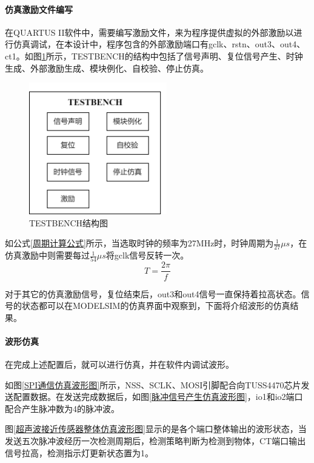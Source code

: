 \paragraph{仿真激励文件编写}
在QUARTUS II软件中，需要编写激励文件，来为程序提供虚拟的外部激励以进行仿真调试，在本设计中，程序包含的外部激励端口有gclk、rstn、out3、out4、ct1。如图\ref{TESTBENCH结构图}所示，TESTBENCH的结构中包括了信号声明、复位信号产生、时钟生成、外部激励生成、模块例化、自校验、停止仿真。\par
\begin{figure}[ht]
	\centering
	\includegraphics[width=6cm]{figure/TESTBENCH structure.png}
	\caption{TESTBENCH结构图}
	\label{TESTBENCH结构图}
\end{figure}
如公式\ref{周期计算公式}所示，当选取时钟的频率为27MHz时，时钟周期为$\frac{1}{27}\mu s$，在仿真激励中则需要每过$\frac{1}{54}
\mu s$将gclk信号反转一次。
\begin{equation}
	T=\frac{2\pi}{f}
	\label{周期计算公式}
\end{equation}\par
对于其它的仿真激励信号，复位结束后，out3和out4信号一直保持着拉高状态。信号的状态都可以在MODELSIM的仿真界面中观察到，下面将介绍波形的仿真结果。

\paragraph{波形仿真}
在完成上述配置后，就可以进行仿真，并在软件内调试波形。

如图\ref{SPI通信仿真波形图}所示，NSS、SCLK、MOSI引脚配合向TUSS4470芯片发送配置数据。在发送完成数据后，如图\ref{脉冲信号产生仿真波形图}，io1和io2端口配合产生脉冲数为4的脉冲波。\par
图\ref{超声波接近传感器整体仿真波形图}显示的是各个端口整体输出的波形状态，当发送五次脉冲波经历一次检测周期后，检测策略判断为检测到物体，CT端口输出信号拉高，检测指示灯更新状态置为1。\par


